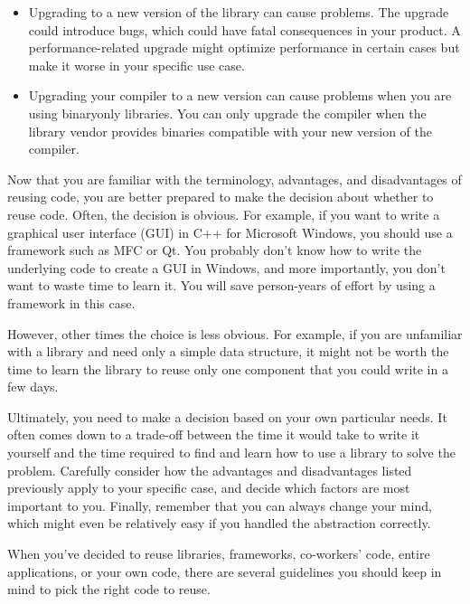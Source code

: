 \begin{itemize}
\item
Upgrading to a new version of the library can cause problems. The upgrade could introduce bugs, which could have fatal consequences in your product. A performance-related upgrade might optimize performance in certain cases but make it worse in your specific use case.

\item
Upgrading your compiler to a new version can cause problems when you are using binaryonly libraries. You can only upgrade the compiler when the library vendor provides binaries compatible with your new version of the compiler.
\end{itemize}


Now that you are familiar with the terminology, advantages, and disadvantages of reusing code, you are better prepared to make the decision about whether to reuse code. Often, the decision is obvious. For example, if you want to write a graphical user interface (GUI) in C++ for Microsoft Windows, you should use a framework such as MFC or Qt. You probably don’t know how to write the underlying code to create a GUI in Windows, and more importantly, you don’t want to waste time to learn it. You will save person-years of effort by using a framework in this case.

However, other times the choice is less obvious. For example, if you are unfamiliar with a library and need only a simple data structure, it might not be worth the time to learn the library to reuse only one component that you could write in a few days.

Ultimately, you need to make a decision based on your own particular needs. It often comes down to a trade-off between the time it would take to write it yourself and the time required to find and learn how to use a library to solve the problem. Carefully consider how the advantages and disadvantages listed previously apply to your specific case, and decide which factors are most important to you. Finally, remember that you can always change your mind, which might even be relatively easy if you handled the abstraction correctly.


When you’ve decided to reuse libraries, frameworks, co-workers’ code, entire applications, or your own code, there are several guidelines you should keep in mind to pick the right code to reuse.

